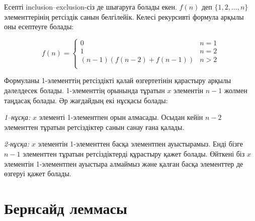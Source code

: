 Есепті inclusion–exclusion-сіз де шығаруға болады екен. 
$f(n)$ деп $\{1,2,\ldots,n\}$ элементтерінің ретсіздік санын белгілейік. 
Келесі рекурсивті формула арқылы оны есептеуге болады:


\begin{equation*}
    f(n) = \begin{cases}
               0               & n = 1\\
               1               & n = 2\\
               (n-1)(f(n-2) + f(n-1)) & n>2 \\
           \end{cases}
\end{equation*}

Формуланы 1-элементтің ретсіздікті қалай өзгертетінін қарастыру арқылы
дәлелдесек болады. 1-элементтің орынында тұратын $x$ элементін $n-1$ жолмен
таңдасақ болады. Әр жағдайдың екі нұсқасы болады:


\textit{1–нұсқа:} $x$ элементі 1-элементпен орын алмасады.
Осыдан кейін $n-2$ элементтен тұратын ретсіздіктер санын санау ғана
қалады. 


\textit{2-нұсқа:} $x$ элементін 1-элементтен басқа 
элементпен ауыстырамыз. Енді бізге $n-1$ элементтен
тұратын ретсіздіктерді құрастыру қажет болады. Өйткені біз
$x$ элементін 1-элементпен ауыстыра алмаймыз және
қалған басқа элементтер де өзгеруі қажет болады. 


\section{Бернсайд леммасы}

